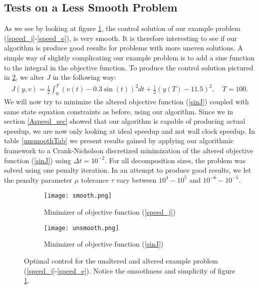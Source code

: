 \subsection{Tests on a Less Smooth Problem}
As we see by looking at figure \ref{smootha}, the control solution of our example problem (\ref{speed_j}-\ref{speed_e}), is very smooth. It is therefore interesting to see if our algorithm is produce good results for problems with more uneven solutions. A simple way of slightly complicating our example problem is to add a sine function to the integral in the objective function. To produce the control solution pictured in \ref{smoothb}, we alter $J$ in the following way:
\begin{align}
J(y,v) = \frac{1}{2}\int_0^{T}(v(t)-0.3\sin(t))^2dt + \frac{1}{2}(y(T)-11.5)^2, \quad T=100. \label{sinJ}
\end{align}
We will now try to minimize the altered objective function (\ref{sinJ}) coupled with same state equation constraints as before, using our algorithm. Since we in section \ref{Aspeed_sec} showed that our algorithm is capable of producing actual speedup, we are now only looking at ideal speedup and not wall clock speedup. In table \ref{unsmoothTab} we present results gained by applying our algorithmic framework to a Crank-Nicholson discretized minimization of the altered objective function (\ref{sinJ}) using $\Delta t = 10^{-2}$. For all decomposition sizes, the problem was solved using one penalty iteration. In an attempt to produce good results, we let the penalty parameter $\mu$ tolerance $\tau$ vary between $10^4-10^5$ and $10^{-6}-10^{-5}$.
\\
\begin{figure}[h]
\centering
\begin{subfigure}{.5\textwidth}
  \centering
  \texttt{[image: smooth.png]}
  \caption{Minimizer of objective function (\ref{speed_j})}
  \label{smootha}
\end{subfigure}%
\begin{subfigure}{.5\textwidth}
  \centering
  \texttt{[image: unsmooth.png]}
  \caption{Minimizer of objective function (\ref{sinJ})}
  \label{smoothb}
\end{subfigure}
\caption{Optimal control for the unaltered and altered example problem (\ref{speed_j}-\ref{speed_e}). Notice the smoothness and simplicity of figure \ref{smootha}.}
\label{smooth}
\end{figure}
